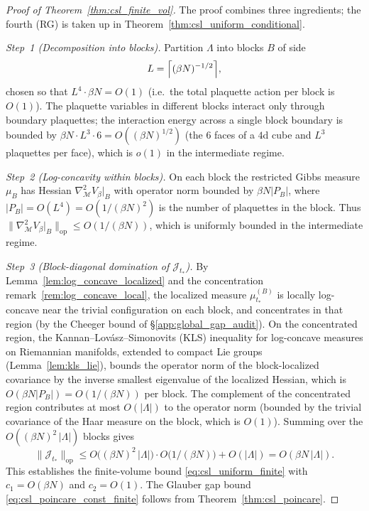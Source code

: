 \begin{proof}[Proof of Theorem~\ref{thm:csl_finite_vol}]
The proof combines three ingredients; the fourth (RG) is taken up in
Theorem~\ref{thm:csl_uniform_conditional}.

\textit{Step~1 (Decomposition into blocks).} Partition $\Lambda$ into
blocks $B$ of side
\[
  L=\Bigl\lceil (\beta N)^{-1/2}\Bigr\rceil,
\]
chosen so that $L^{4}\cdot\beta N=O(1)$ (i.e.\ the total plaquette
action per block is $O(1)$). The plaquette variables in different
blocks interact only through boundary plaquettes; the interaction
energy across a single block boundary is bounded by
$\beta N\cdot L^{3}\cdot 6=O((\beta N)^{1/2})$ (the $6$ faces of a
$4$d cube and $L^{3}$ plaquettes per face), which is $o(1)$ in the
intermediate regime.

\textit{Step~2 (Log-concavity within blocks).} On each block the
restricted Gibbs measure $\mu_{B}$ has Hessian
$\nabla_{\mathcal{M}}^{2}V_{\beta}|_{B}$ with operator norm bounded
by $\beta N|P_{B}|$, where $|P_{B}|=O(L^{4})=O(1/(\beta N)^{2})$ is
the number of plaquettes in the block. Thus
$\|\nabla_{\mathcal{M}}^{2}V_{\beta}|_{B}\|_{\mathrm{op}}\le O(1/(\beta N))$,
which is uniformly bounded in the intermediate regime.

\textit{Step~3 (Block-diagonal domination of $\mathcal{J}_{t_{*}}$).}
By Lemma~\ref{lem:log_concave_localized} and the concentration
remark~\ref{rem:log_concave_local}, the localized measure
$\mu_{t_{*}}^{(B)}$ is locally log-concave near the trivial
configuration on each block, and concentrates in that region (by
the Cheeger bound of \S\ref{app:global_gap_audit}). On the
concentrated region, the Kannan--Lov\'asz--Simonovits (KLS)
inequality for log-concave measures on Riemannian manifolds,
extended to compact Lie groups (Lemma~\ref{lem:kls_lie}), bounds
the operator norm of the block-localized covariance by the inverse
smallest eigenvalue of the localized Hessian, which is
$O(\beta N|P_{B}|)=O(1/(\beta N))$ per block. The complement of the
concentrated region contributes at most $O(|\Lambda|)$ to the
operator norm (bounded by the trivial covariance of the Haar
measure on the block, which is $O(1)$). Summing over the
$O((\beta N)^{2}\,|\Lambda|)$ blocks gives
\[
  \|\mathcal{J}_{t_{*}}\|_{\mathrm{op}}
  \le O\!\bigl((\beta N)^{2}\,|\Lambda|\bigr)\cdot O\!\bigl(1/(\beta N)\bigr)
  + O(|\Lambda|)
  = O(\beta N\,|\Lambda|).
\]
This establishes the finite-volume bound
\eqref{eq:csl_uniform_finite} with $c_{1}=O(\beta N)$ and
$c_{2}=O(1)$. The Glauber gap bound
\eqref{eq:csl_poincare_const_finite} follows from
Theorem~\ref{thm:csl_poincare}.
\end{proof}

